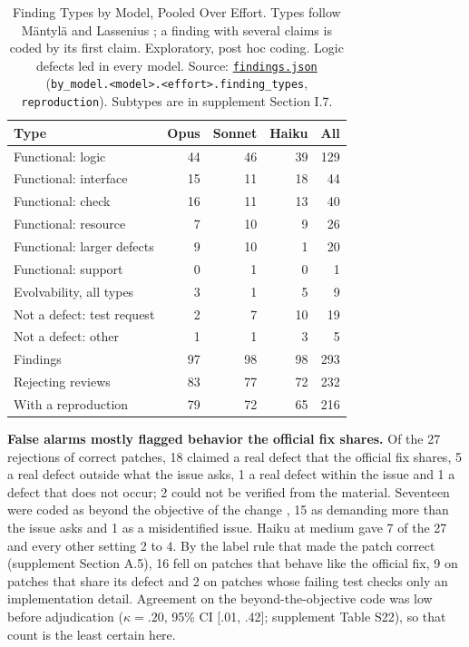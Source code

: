 \documentclass[sigconf,nonacm]{acmart}
\newcommand{\code}[1]{\texttt{#1}}
\begin{document}
\begin{table}[t]
\caption{Finding Types by Model, Pooled Over Effort. Types follow M\"antyl\"a and Lassenius \cite{mantyla2009defects}; a finding with several claims is coded by its first claim. Exploratory, post hoc coding. Logic defects led in every model. Source: \href{https://github.com/trustmybot/research-artifacts/blob/cr-effort-claude-5.5-v1.1/papers/cr-effort-claude-5.5/findings/artifact/outputs/findings.json}{\code{findings.json}} (\code{by\_model.<model>.<effort>.finding\_types}, \code{reproduction}). Subtypes are in supplement Section I.7.}\label{tab:types}
\footnotesize
\begin{tabular}{@{}l r r r r@{}}
\toprule
Type & Opus & Sonnet & Haiku & All \\
\midrule
Functional: logic & 44 & 46 & 39 & 129 \\
Functional: interface & 15 & 11 & 18 & 44 \\
Functional: check & 16 & 11 & 13 & 40 \\
Functional: resource & 7 & 10 & 9 & 26 \\
Functional: larger defects & 9 & 10 & 1 & 20 \\
Functional: support & 0 & 1 & 0 & 1 \\
Evolvability, all types & 3 & 1 & 5 & 9 \\
Not a defect: test request & 2 & 7 & 10 & 19 \\
Not a defect: other & 1 & 1 & 3 & 5 \\
\midrule
Findings & 97 & 98 & 98 & 293 \\
Rejecting reviews & 83 & 77 & 72 & 232 \\
With a reproduction & 79 & 72 & 65 & 216 \\
\bottomrule
\end{tabular}
\end{table}

\textbf{False alarms mostly flagged behavior the official fix shares.} Of the 27 rejections of correct patches, 18 claimed a real defect that the official fix shares, 5 a real defect outside what the issue asks, 1 a real defect within the issue and 1 a defect that does not occur; 2 could not be verified from the material. Seventeen were coded as beyond the objective of the change \cite{lin2026coderabbit}, 15 as demanding more than the issue asks \cite{jin2026overcorrection} and 1 as a misidentified issue. Haiku at medium gave 7 of the 27 and every other setting 2 to 4. By the label rule that made the patch correct (supplement Section A.5), 16 fell on patches that behave like the official fix, 9 on patches that share its defect and 2 on patches whose failing test checks only an implementation detail. Agreement on the beyond-the-objective code was low before adjudication ($\kappa = .20$, 95\% CI [.01, .42]; supplement Table S22), so that count is the least certain here.
\end{document}
